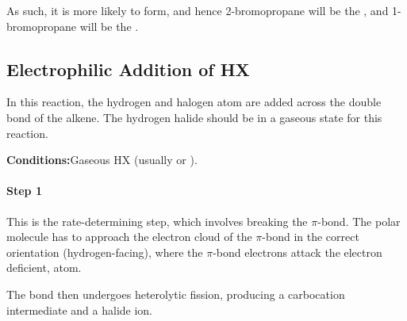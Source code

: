 				As such, it is more likely to form, and hence 2-bromopropane will be the , and
				1-bromopropane will be the .






		\pagebreak
		\subsection{Electrophilic Addition of HX}

			In this reaction, the hydrogen and halogen atom are added across the double bond of the alkene. The hydrogen halide
			should be in a gaseous state for this reaction.

			\vspace{1.5em}
			\vbox{\textbf{Conditions:}\tabto{35mm}Gaseous HX (usually  or ).}

			\paragraph{Step 1}



			This is the rate-determining step, which involves breaking the $\pi$-bond. The polar  molecule has to
			approach the electron cloud of the $\pi$-bond in the correct orientation (hydrogen-facing), where the $\pi$-bond electrons
			attack the electron deficient,  atom.

			The  bond then undergoes heterolytic fission, producing a carbocation intermediate and a halide ion.


